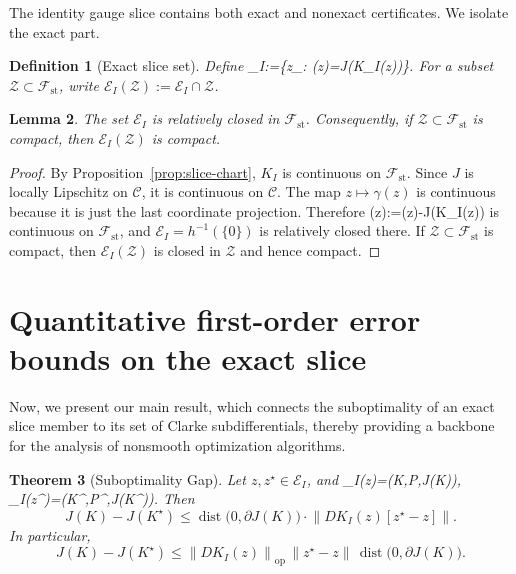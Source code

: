 \documentclass[letterpaper,10pt,conference]{ieeeconf}
\def\[#1\]{\begin{align*}#1\end{align*}}
\providecommand{\cC}{\mathcal{C}}
\providecommand{\cF}{\mathcal{F}}
\providecommand{\cE}{\mathcal{E}}
\providecommand{\cZ}{\mathcal{Z}}
\providecommand{\distop}{\operatorname{dist}}
\providecommand{\opnorm}[1]{\left\|#1\right\|_{\mathrm{op}}}
\renewcommand{\^}[1]{^{(#1)}}
\newtheorem{theorem}{Theorem}
\newtheorem{lemma}[theorem]{Lemma}
\newtheorem{definition}[theorem]{Definition}
\begin{document}
The identity gauge slice contains both exact and nonexact certificates. We isolate the exact part.

\begin{definition}[Exact slice set]
Define
\[
\cE_I:=\{z\in\cF_{}: \gamma(z)=J(K_I(z))\}.
\]
For a subset $\cZ\subset \cF_{\mathrm{st}}$, write $\cE_I(\cZ):=\cE_I\cap \cZ$.
\end{definition}

\begin{lemma}\label{lem:closed-exact}
The set $\cE_I$ is relatively closed in $\cF_{\mathrm{st}}$. Consequently, if $\cZ\subset\cF_{\mathrm{st}}$ is compact, then $\cE_I(\cZ)$ is compact.
\end{lemma}

\begin{proof}
By Proposition~\ref{prop:slice-chart}, $K_I$ is continuous on $\cF_{\mathrm{st}}$. Since $J$ is locally Lipschitz on $\cC$, it is continuous on $\cC$. The map $z\mapsto \gamma(z)$ is continuous because it is just the last coordinate projection. Therefore
\[
h(z):=\gamma(z)-J(K_I(z))
\]
is continuous on $\cF_{\mathrm{st}}$, and $\cE_I=h^{-1}(\{0\})$ is relatively closed there. If $\cZ\subset\cF_{\mathrm{st}}$ is compact, then $\cE_I(\cZ)$ is closed in $\cZ$ and hence compact.
\end{proof}

\section{Quantitative first-order error bounds on the exact slice}
\label{sec:quantitative}

Now, we present our main result, which connects the suboptimality of an exact slice member to its set of Clarke subdifferentials, thereby providing a backbone for the analysis of nonsmooth optimization algorithms.

\begin{theorem}[Suboptimality Gap]\label{thm:pairwise}
Let $z,z^\star\in\cE_I$, and
\[
\Psi_I(z)=\bigl(K,P,J(K)\bigr),
\qquad
\Psi_I(z^\star)=\bigl(K^\star,P^\star,J(K^\star)\bigr).
\]
Then
\begin{equation}\label{eq:pairwise-exact}
J(K)-J(K^\star)
\le
\distop\!\bigl(0,\partial J(K)\bigr)
\cdot
\bigl\|D K_I(z)[z^\star-z]\bigr\|.
\end{equation}
In particular,
\begin{equation*}
J(K)-J(K^\star)
\le
\opnorm{D K_I(z)}\,\|z^\star-z\|\,\distop\!\bigl(0,\partial J(K)\bigr).
\end{equation*}
\end{theorem}
\end{document}

